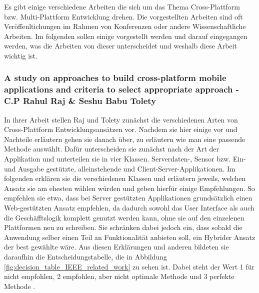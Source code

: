 Es gibt einige verschiedene Arbeiten die sich um das Thema Cross-Plattform bzw. Multi-Plattform Entwicklung drehen. Die vorgestellten Arbeiten sind oft Veröffenltichungen im Rahmen von Konferenzen oder andere Wissenschaftliche Arbeiten. Im folgenden sollen einige vorgestellt werden und darauf eingegangen werden, was die Arbeiten von dieser unterscheidet und weshalb diese Arbeit wichtig ist.

\subsubsection{A study on approaches to build cross-platform mobile applications and criteria to select appropriate approach - C.P Rahul Raj \& Seshu Babu Tolety}
In ihrer Arbeit stellen Raj und Tolety zunächst die verschiedenen Arten von Cross-Plattform Entwicklungsansätzen vor. Nachdem sie hier einige vor und Nachteile erläutern gehen sie danach über, zu erläutern wie man eine passende Methode auswählt. Dafür unterscheiden sie zunächst nach der Art der Applikation und unterteilen sie in vier Klassen. Serverdaten-, Sensor bzw. Ein-und Ausgabe gestützte, alleinstehende und Client-Server-Applikationen. Im folgenden erklären sie die verschiedenen Klassen und erläutern jeweils, welchen Ansatz sie am ehesten wählen würden und geben hierfür einige Empfehlungen. So empfehlen sie etwa, dass bei Server gestützten Applikationen grundsätzlich einen Web-gestützten Ansatz empfehlen, da dadurch sowohl das User Interface als auch die Geschäfftslogik komplett genutzt werden kann, ohne sie auf den einzelenen Plattformen neu zu schreiben. Sie schränken dabei jedoch ein, dass sobald die Anwendung selber einen Teil an Funktionalität anbieten soll, ein Hybrider Ansatz der best gewählte wäre. Aus diesen Erklärungen und anderen bildeten sie daraufhin die Entscheidungstabelle, die in Abbildung \ref{fig:decision_table_IEEE_related_work} zu sehen ist. Dabei steht der Wert 1 für nicht empfohlen, 2 empfohlen, aber nicht optimale Methode und 3 perfekte Methode \cite{IEEE_Rahul_Seshu}.

